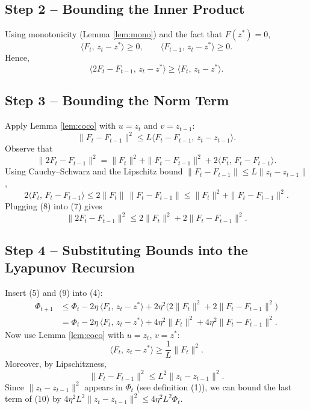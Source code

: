 \documentclass{article}
\begin{document}
\subsection*{Step 2 – Bounding the Inner Product}
Using monotonicity (Lemma \ref{lem:mono}) and the fact that $F(z^{*})=0$,
\[
\langle F_{t},\,z_{t}-z^{*}\rangle\ge0,\qquad
\langle F_{t-1},\,z_{t}-z^{*}\rangle\ge0.
\]
Hence,
\[
\langle 2F_{t}-F_{t-1},\,z_{t}-z^{*}\rangle
\ge \langle F_{t},\,z_{t}-z^{*}\rangle.
\tag{5}
\]

\subsection*{Step 3 – Bounding the Norm Term}
Apply Lemma \ref{lem:coco} with $u=z_{t}$ and $v=z_{t-1}$:
\[
\|F_{t}-F_{t-1}\|^{2}\le L\langle F_{t}-F_{t-1},\,z_{t}-z_{t-1}\rangle.
\tag{6}
\]
Observe that
\[
\|2F_{t}-F_{t-1}\|^{2}
= \|F_{t}\|^{2}+ \|F_{t}-F_{t-1}\|^{2}+2\langle F_{t},\,F_{t}-F_{t-1}\rangle.
\tag{7}
\]
Using Cauchy–Schwarz and the Lipschitz bound $\|F_{t}-F_{t-1}\|\le L\|z_{t}-z_{t-1}\|$,
\[
2\langle F_{t},\,F_{t}-F_{t-1}\rangle
\le 2\|F_{t}\|\,\|F_{t}-F_{t-1}\|
\le \|F_{t}\|^{2}+ \|F_{t}-F_{t-1}\|^{2}.
\tag{8}
\]
Plugging (8) into (7) gives
\[
\|2F_{t}-F_{t-1}\|^{2}
\le 2\|F_{t}\|^{2}+2\|F_{t}-F_{t-1}\|^{2}.
\tag{9}
\]

\subsection*{Step 4 – Substituting Bounds into the Lyapunov Recursion}
Insert (5) and (9) into (4):
\begin{align}
\Phi_{t+1}
&\le \Phi_{t}
-2\eta\,\langle F_{t},\,z_{t}-z^{*}\rangle
+2\eta^{2}\bigl(2\|F_{t}\|^{2}+2\|F_{t}-F_{t-1}\|^{2}\bigr) \nonumber\\
&= \Phi_{t}
-2\eta\,\langle F_{t},\,z_{t}-z^{*}\rangle
+4\eta^{2}\|F_{t}\|^{2}+4\eta^{2}\|F_{t}-F_{t-1}\|^{2}.
\tag{10}
\end{align}
Now use Lemma \ref{lem:coco} with $u=z_{t}$, $v=z^{*}$:
\[
\langle F_{t},\,z_{t}-z^{*}\rangle\ge\frac{1}{L}\|F_{t}\|^{2}.
\tag{11}
\]
Moreover, by Lipschitzness,
\[
\|F_{t}-F_{t-1}\|^{2}\le L^{2}\|z_{t}-z_{t-1}\|^{2}.
\tag{12}
\]
Since $\|z_{t}-z_{t-1}\|^{2}$ appears in $\Phi_{t}$ (see definition (1)),
we can bound the last term of (10) by $4\eta^{2}L^{2}\|z_{t}-z_{t-1}\|^{2}\le 4\eta^{2}L^{2}\Phi_{t}$.
\end{document}
